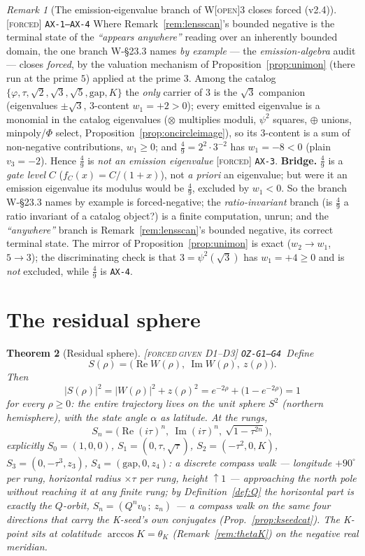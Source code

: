 \documentclass[11pt]{article}
\newcommand{\tagF}{\textcolor{cF}{\textsc{[forced]}}}
\newcommand{\tagFD}{\textcolor{cF}{\textsc{[forced}}\,\textcolor{cD}{\textsc{given D1--D3]}}}
\newcommand{\tagO}{\textcolor{cO}{\textsc{[open]}}}
\newcommand{\hx}[1]{\textcolor{cC}{\footnotesize\texttt{#1}}}
\newcommand{\gp}{\varphi}
\newcommand{\gapc}{\mathrm{gap}}
\DeclareMathOperator{\Rea}{Re}
\DeclareMathOperator{\Ima}{Im}
\theoremstyle{plain}
\newtheorem{theorem}{Theorem}[section]
\theoremstyle{definition}
\theoremstyle{remark}
\newtheorem{remark}[theorem]{Remark}
\begin{document}
\begin{remark}[The emission-eigenvalue branch of {W\tagO{}3} closes forced (v2.4)]\label{rem:lens49}\tagF{} \hx{AX-1--AX-4}
Where Remark~\ref{rem:lensscan}'s bounded negative is the terminal state of the
\emph{``appears anywhere''} reading over an inherently bounded domain, the one
branch W-\S23.3 names \emph{by example} --- the \emph{emission-algebra} audit ---
closes \emph{forced}, by the valuation mechanism of Proposition~\ref{prop:unimon}
(there run at the prime $5$) applied at the prime $3$. Among the catalog
$\{\gp,\tau,\sqrt2,\sqrt3,\sqrt5,\gapc,K\}$ the \emph{only} carrier of $3$ is the
$\sqrt3$ companion (eigenvalues $\pm\sqrt3$, $3$-content $w_1=+2>0$); every emitted
eigenvalue is a monomial in the catalog eigenvalues ($\otimes$ multiplies moduli,
$\psi^2$ squares, $\oplus$ unions, minpoly/$\Phi$ select,
Proposition~\ref{prop:oncircleimage}), so its $3$-content is a sum of non-negative
contributions, $w_1\ge0$; and $\tfrac49=2^2\cdot3^{-2}$ has $w_1=-8<0$ (plain
$v_3=-2$). Hence $\tfrac49$ is \emph{not an emission eigenvalue} \tagF{}
\hx{AX-3}. \textbf{Bridge.} $\tfrac49$ is a \emph{gate level} $C$
($f_C(x)=C/(1+x)$), not \emph{a priori} an eigenvalue; but were it an emission
eigenvalue its modulus would be $\tfrac49$, excluded by $w_1<0$. So the branch
W-\S23.3 names by example is forced-negative; the \emph{ratio-invariant} branch
(is $\tfrac49$ a ratio invariant of a catalog object?) is a finite computation,
unrun; and the \emph{``anywhere''} branch is Remark~\ref{rem:lensscan}'s bounded
negative, its correct terminal state. The mirror of Proposition~\ref{prop:unimon}
is exact ($w_2\to w_1$, $5\to3$); the discriminating check is that
$3=\psi^2(\sqrt3)$ has $w_1=+4\ge0$ and is \emph{not} excluded, while $\tfrac49$
is \hx{AX-4}.
\end{remark}

\section{The residual sphere}\label{sec:sphere}

\begin{theorem}[Residual sphere]\label{thm:sphere}\tagFD{}
\hx{OZ-G1--G4}\ Define
\[
S(\rho)=\bigl(\Rea W(\rho),\ \Ima W(\rho),\ z(\rho)\bigr).
\]
Then
\[
|S(\rho)|^2=|W(\rho)|^2+z(\rho)^2=e^{-2\rho}+\bigl(1-e^{-2\rho}\bigr)=1
\]
for every $\rho\ge0$:
the entire trajectory lives on the unit sphere $S^2$ (northern hemisphere), with
the state angle $\alpha$ as latitude. At the rungs,
\[
S_n=\bigl(\Rea(i\tau)^n,\ \Ima(i\tau)^n,\ \sqrt{1-\tau^{2n}}\bigr),
\]
explicitly $S_0=(1,0,0)$, $S_1=(0,\tau,\sqrt\tau)$,
$S_2=(-\tau^2,0,K)$, $S_3=(0,-\tau^3,z_3)$, $S_4=(\gapc,0,z_4)$: a discrete
compass walk --- longitude $+90^\circ$ per rung, horizontal radius $\times\tau$
per rung, height $\uparrow1$ --- approaching the north pole without reaching it
at any finite rung; by Definition~\ref{def:Q} the horizontal part is exactly
the $Q$-orbit, $S_n=(Q^nv_0\,;\ z_n)$ --- a compass walk on the same four
directions that carry the K-seed's own conjugates
(Prop.~\ref{prop:kseedcat}). The K-point sits at colatitude
$\arccos K=\theta_K$ (Remark~\ref{rem:thetaK}) on the negative real meridian.
\end{theorem}
\end{document}
